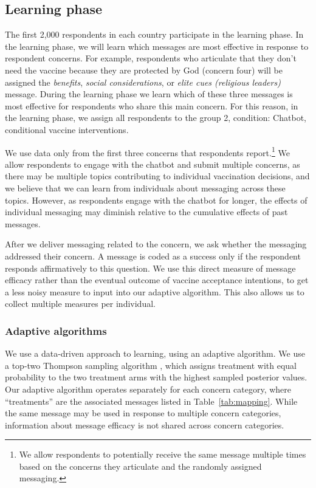 \documentclass[letterpaper, 12pt, parskip=full,DIV=10]{scrartcl}
\begin{document}
\subsection{Learning phase}

The first 2,000 respondents in each country participate in the learning phase. In the learning phase, we will learn which messages are most effective in response to respondent concerns.  For example, respondents who articulate that they don't need the vaccine because they are protected by God (concern four) will be assigned the \textit{benefits}, \emph{social considerations}, or \emph{elite cues (religious leaders)} message. During the learning phase we learn which of these three messages is most effective for respondents who share this main concern. For this reason, in the learning phase, we assign all respondents to the group 2, condition: Chatbot, conditional vaccine interventions. 

We use data only from the first three concerns that respondents report.\footnote{We allow respondents to potentially receive the same message multiple times based on the concerns they articulate and the randomly assigned messaging.} We allow respondents to engage with the chatbot and submit multiple concerns, as there may be multiple topics contributing to individual vaccination decisions, and we believe that we can learn from individuals about messaging across these topics. However, as respondents engage with the chatbot for longer, the effects of individual messaging may diminish relative to the cumulative effects of past messages. 

After we deliver messaging related to the concern, we ask whether the messaging addressed their concern. A message is coded as a success only if the respondent responds affirmatively to this question. We use this direct measure of message efficacy rather than the eventual outcome of vaccine acceptance intentions, to get a less noisy measure to input into our adaptive algorithm. This also allows us to collect multiple measures per individual. 

\subsubsection{Adaptive algorithms}
We use a data-driven approach to learning, using an adaptive algorithm. We use a top-two Thompson sampling algorithm \citep{russo16a}, which assigns treatment with equal probability to the two treatment arms with the highest sampled posterior values. Our adaptive algorithm operates separately for each concern category, where ``treatments'' are the associated messages listed in Table~\ref{tab:mapping}. While the same message may be used in response to multiple concern categories, information about message efficacy is not shared across concern categories.  
\end{document}
